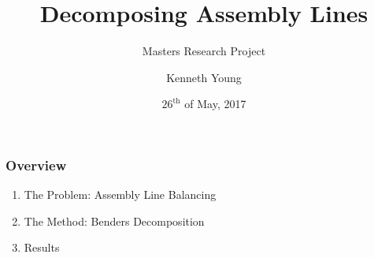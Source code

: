 \documentclass{beamer}
\title[Decomposing Assembly Lines]{Decomposing Assembly Lines}
\subtitle{Masters Research Project}
\author{Kenneth Young}
\institute[]
{
Supervisor: Dr. Alysson M. Costa\\[2mm]
University of Melbourne \\
}
\date{$26^{\text{th}}$ of May, 2017}
\begin{document}
\begin{frame}
\titlepage
\end{frame}

\begin{frame}
\frametitle{Overview}
\begin{enumerate}
	\item The Problem: Assembly Line Balancing \vspace{1cm}
	\item The Method: Benders Decomposition \vspace{1cm}
	\item Results
\end{enumerate}
\end{frame}

\end{document}
